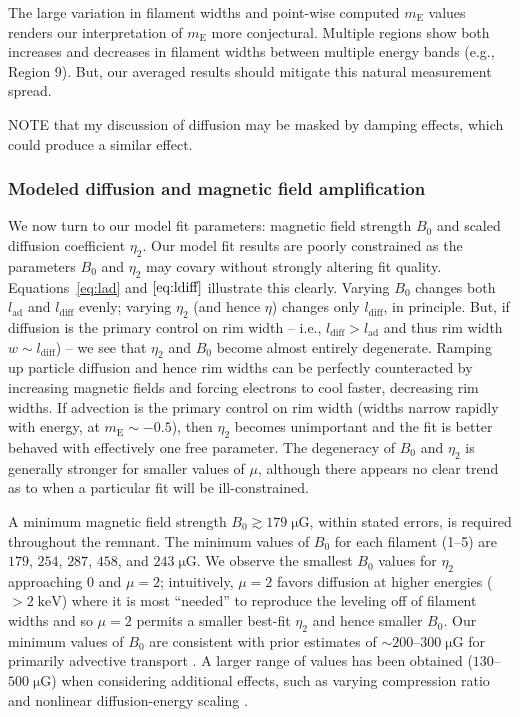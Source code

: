 \documentclass[iop, apj, numberedappendix]{emulateapj}
\newcommand*{\mt}{\mathrm}
\newcommand*{\unit}[1]{\;\mt{#1}}  %
\newcommand*{\abt}{\mathord{\sim}} %
\newcommand*{\mE}{m_\mt{E}}
\newcommand*{\muG}{\unit{\mu G}}
\begin{document}
The large variation in filament widths and point-wise computed $\mE$ values
renders our interpretation of $\mE$ more conjectural.  Multiple regions show both
increases and decreases in filament widths between multiple energy bands (e.g.,
Region 9).  But, our averaged results should mitigate this natural measurement
spread.

NOTE that my discussion of diffusion may be masked by damping effects, which
could produce a similar effect.

\subsubsection{Modeled diffusion and magnetic field amplification}

We now turn to our model fit parameters: magnetic field strength $B_0$ and
scaled diffusion coefficient $\eta_2$.  Our model fit results are poorly
constrained as the parameters $B_0$ and $\eta_2$ may covary without strongly
altering fit quality.  Equations~\eqref{eq:lad} and $\eqref{eq:ldiff}$
illustrate this clearly.  Varying $B_0$ changes both $l_{\mt{ad}}$ and
$l_{\mt{diff}}$ evenly; varying $\eta_2$ (and hence $\eta$) changes only
$l_{\mt{diff}}$, in principle.  But, if diffusion is the primary control on rim
width -- i.e., $l_{\mt{diff}} > l_{\mt{ad}}$ and thus rim width $w \sim
l_{\mt{diff}}$) -- we see that $\eta_2$ and $B_0$ become almost entirely
degenerate.  Ramping up particle diffusion and hence rim widths can be
perfectly counteracted by increasing magnetic fields and forcing electrons to
cool faster, decreasing rim widths.  If advection is the primary control on rim
width (widths narrow rapidly with energy, at $\mE \sim -0.5$), then $\eta_2$
becomes unimportant and the fit is better behaved with effectively one free
parameter.  The degeneracy of $B_0$ and $\eta_2$ is generally stronger for
smaller values of $\mu$, although there appears no clear trend as to when a
particular fit will be ill-constrained.

A minimum magnetic field strength $B_0 \gtrsim 179 \muG$, within stated
errors, is required throughout the remnant.  The minimum values of $B_0$ for
each filament (1--5) are $179$, $254$, $287$, $458$, and $243 \muG$.
We observe the smallest $B_0$ values for $\eta_2$ approaching $0$ and $\mu =
2$; intuitively, $\mu = 2$ favors diffusion at higher energies ($>2\unit{keV}$)
where it is most ``needed'' to reproduce the leveling off of filament widths
and so $\mu = 2$ permits a smaller best-fit $\eta_2$ and hence smaller $B_0$.
Our minimum values of $B_0$ are consistent with prior estimates of
$\abt 200$--$300 \muG$ for primarily advective transport
\citep{volk2005, parizot2006, morlino2012} .  A larger range of values has been
obtained ($130$--$500 \muG$) when considering additional effects, such as
varying compression ratio and nonlinear diffusion-energy scaling
\citep{parizot2006, cassam-chenai2007}.
\end{document}
